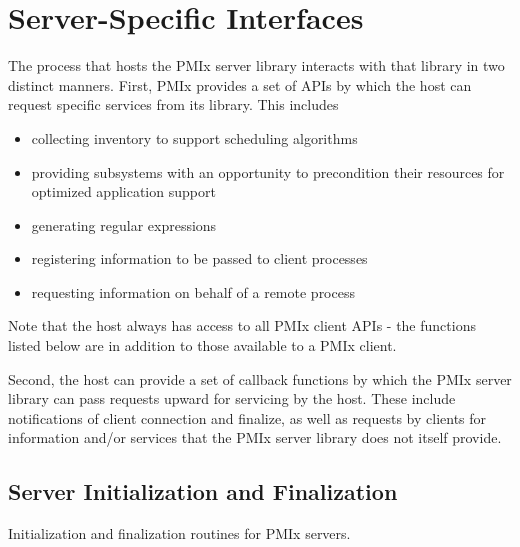 \chapter{Server-Specific Interfaces}
\label{chap:api_server}

The process that hosts the \ac{PMIx} server library interacts with that library in two distinct manners. First, \ac{PMIx} provides a set of \acp{API} by which the host can request specific services from its library. This includes

\begin{itemize}
    \item collecting inventory to support scheduling algorithms
    \item providing subsystems with an opportunity to precondition their resources for optimized application support
    \item generating regular expressions
    \item registering information to be passed to client processes
    \item requesting information on behalf of a remote process
\end{itemize}

Note that the host always has access to all \ac{PMIx} client \acp{API} - the functions listed below are in addition to those available to a \ac{PMIx} client.

Second, the host can provide a set of callback functions by which the \ac{PMIx} server library can pass requests upward for servicing by the host. These include notifications of client connection and finalize, as well as requests by clients for information and/or services that the \ac{PMIx} server library does not itself provide.

\section{Server Initialization and Finalization}
\label{chap:api_init:server}

Initialization and finalization routines for \ac{PMIx} servers.

\subsection{}

